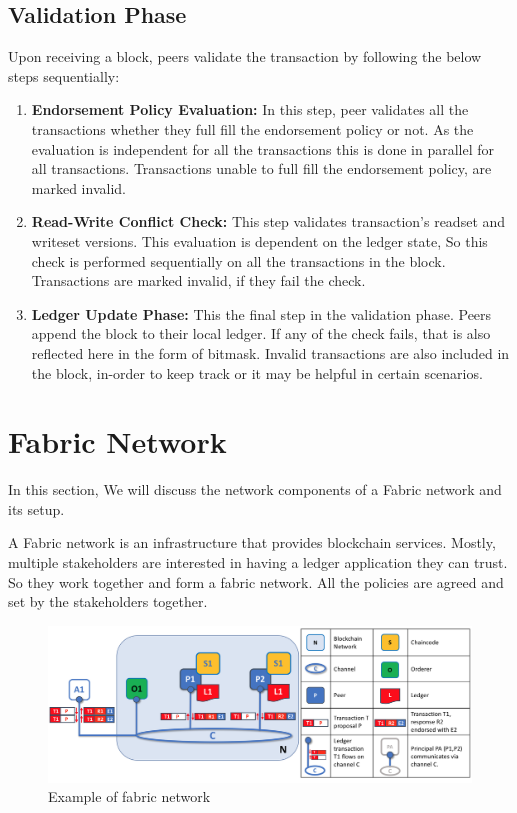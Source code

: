 \subsection{Validation Phase}
Upon receiving a block, peers validate the transaction by following the below steps sequentially:
\begin{enumerate}
\item \textbf{Endorsement Policy Evaluation:} In this step, peer validates all the transactions whether they full fill the endorsement policy or not. As the evaluation is independent for all the transactions this is done in parallel for all transactions. Transactions unable to full fill the endorsement policy, are marked invalid.
\item \textbf{Read-Write Conflict Check:} This step validates transaction's readset and writeset versions. This evaluation is dependent on the ledger state, So this check is performed sequentially on all the transactions in the block. Transactions are marked invalid, if they fail the check. 
\item \textbf{Ledger Update Phase:} This the final step in the validation phase. Peers append the block to their local ledger.
If any of the check fails, that is also reflected here in the form of bitmask. Invalid transactions are also included in the block, in-order to keep track or it may be helpful in certain scenarios.
\end{enumerate}


\section{Fabric Network}

In this section, We will discuss the network components of a Fabric network and its setup.

A Fabric network\cite{fabric_network} is an infrastructure that provides blockchain services. Mostly, multiple stakeholders are interested in having a ledger application they can trust. So they work together and form a fabric network. All the policies are agreed and set by the stakeholders together.
 
\begin{figure}[!h]
    \centering
    \includegraphics[width=1\textwidth]{images/fabric_network.png}
    \caption{Example of fabric network  \cite{fabric_network_image}}
    \label{fig:fabric_network}
\end{figure}
